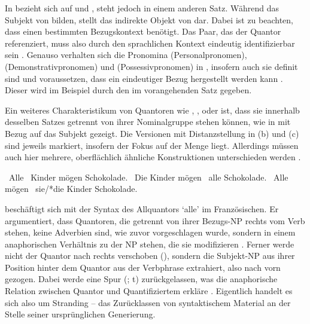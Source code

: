 In  bezieht sich  auf  und ,
steht jedoch in einem anderen Satz. Während  das Subjekt
von  bilden, stellt  das indirekte Objekt von
 dar. Dabei ist zu beachten, dass  einen bestimmten
Bezugskontext benötigt. Das Paar, das der Quantor referenziert, muss also durch
den sprachlichen Kontext eindeutig identifizierbar sein
\autocites[vgl.~z.\,B.][274]{lyons1999}[788]{schwartz2000}[983]{janssen2004}.
Genauso verhalten sich die Pronomina  (Personalpronomen), 
(Demonstrativpronomen) und  (Possessivpronomen) in
, insofern auch sie definit sind und voraussetzen, dass
ein eindeutiger Bezug hergestellt werden kann
\autocites[vgl.][145--148]{lyons1999}. Dieser wird im Beispiel durch den
 im vorangehenden Satz gegeben.

Ein weiteres Charakteristikum von Quantoren wie ,
,  oder  ist, dass sie innerhalb desselben
Satzes getrennt von ihrer Nominalgruppe stehen können, wie in
 mit Bezug auf das Subjekt gezeigt. Die Versionen mit
Distanzstellung in (b) und (c) sind jeweils markiert, insofern der Fokus auf
der Menge liegt. Allerdings müssen auch hier mehrere, oberflächlich ähnliche
Konstruktionen unterschieden werden
\autocites[27--28]{pittner1995}[65--67]{fanselowcavar2002}.

\begin{exe}
\ex \label{ex:floatsubj}
\begin{xlist}
	\ex \label{ex:floatsubj_1}
		{\ob}~Alle {\ob}~Kinder{\cb}{\cb} mögen Schokolade.
	\ex \label{ex:floatsubj_2}
		{\ob}~Die Kinder{\cb} mögen {\ob}~alle{\cb}
		Schokolade.
	\ex \label{ex:floatsubj_3}
		{\ob}~Alle{\cb} mögen {\ob}~sie/*die
		Kinder{\cb} Schokolade.
\end{xlist}
\end{exe}

\citet{sportiche1988} beschäftigt sich mit der Syntax des Allquantors 
`alle' im Französischen. Er argumentiert, dass Quantoren, die
getrennt von ihrer Bezugs-NP rechts vom Verb stehen, keine Adverbien sind, wie
zuvor vorgeschlagen wurde, sondern in einem anaphorischen Verhältnis zu der NP
stehen, die sie modifizieren \autocite[428--433]{sportiche1988}. Ferner werde
nicht der Quantor nach rechts verschoben (), sondern die
Subjekt-NP aus ihrer Position hinter dem Quantor aus der Verbphrase extrahiert,
also nach vorn gezogen. Dabei werde eine Spur (; t) zurückgelassen,
was die anaphorische Relation zwischen Quantor und Quantifiziertem erkläre
\autocite[432--433]{sportiche1988}. Eigentlich handelt es sich also um
Stranding -- das Zurücklassen von syntaktischem Material an der Stelle seiner
ursprünglichen Generierung.

